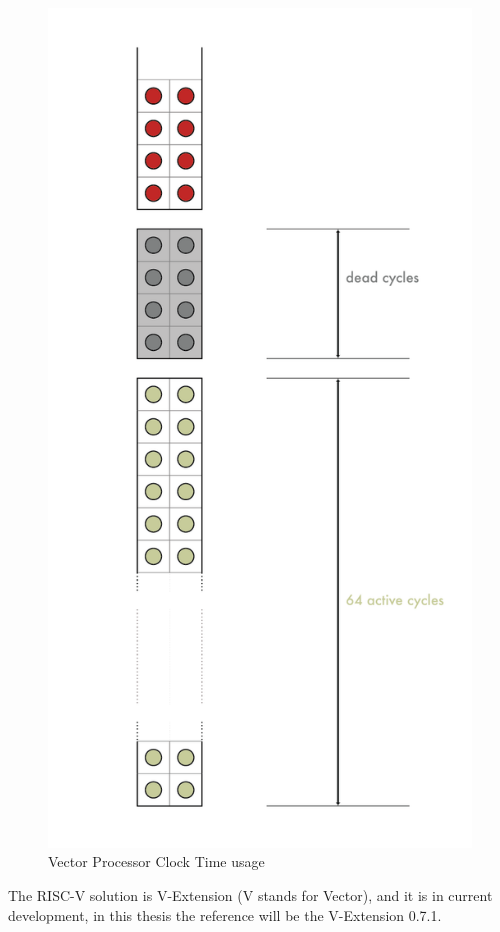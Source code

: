 \begin{figure}[H]
    \centering
    \includegraphics[scale = 0.35]{Chapter_1/img/time-usage.png}
    \caption{Vector Processor Clock Time usage \cite{L15-Krste}}
    \label{Vectoring}
\end{figure}
The RISC-V solution is V-Extension (V stands for Vector), and it is in current development, in this thesis the reference will be the V-Extension 0.7.1.

